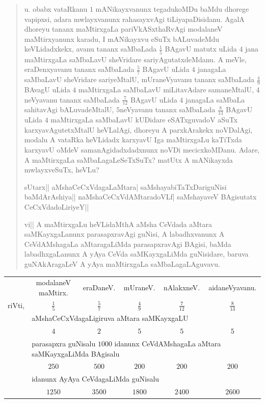 \begin{verse}
u. obabx vataRkanu $1$ mANikayxvanunx tegadukoMDu baMdu dhorege
vapipxsi, adara mwlayxvanunx rahasayxvAgi tiLiyapaDisidanu. AgalA
dhoreyu tananx maMtirxgaLa pariVkASxthaRvAgi modalaneV maMtirxyanunx
karadu, I mANikayxvu eSuTx bALuvadeMdu keVLidadxkekx, avanu tananx
saMbaLada $\frac{1}{5}$ BAgavU matutx uLida $4$ jana maMtirxgaLa
saMbaLavU sheVridare sariyAgutatxdeMdanu. A meVle, eraDenxyavanu
tananx saMbaLada $\frac{5}{7}$ BAgavU uLida $4$ janagaLa saMbaLavU
sheVridare sariyeMtalU, mUraneVyavanu tananx saMbaLada $\frac{4}{9}$
BAvagU uLida $4$ maMtirxgaLa saMbaLavU miLitavAdare samaneMtalU,
$4$neVyavanu tananx saMbaLada $\frac{7}{12}$ BAgavU uLida $4$ janagaLa
saMbaLa sahitavAgi bALuvadeMtalU, $5$neVyavanu tananx saMbaLada
$\frac{8}{13}$ BAgavU uLida $4$ maMtirxgaLa saMbaLavU kUDidare
eSATxguvadoV aSuTx karxyavAgutetxMtalU heVLalAgi, dhoreyu A
parxkArakekx noVDalAgi, modalu A vataRka heVLidadx karxyavU Iga
maMtirxgaLu kaTiTxda karxyavU oMdeV samanAgidadxdadxnunx noVDi
mecicxkoMDanu. Adare, A maMtirxgaLa saMbaLagaLeSeTxSuTx? matUtx A
mANikayxda mwlayxveSuTx, heVLu? 

sUtarx|| aMshaCeCxVdagaLaMtara| saMshayabiTaTxDariguNisi
baMdArAshiya|| naMshaCeCxVdAMtaradoVLf| saMshayaveV BAgisutatx
CeCxVdadoLiriyeY|| 

vi|| A maMtirxgaLu heVLidaMthA aMsha CeVdada aMtara saMKayxgaLanunx
parasapxravAgi guNisi, A labadhx\-vanunx A CeVdAMshagaLa aMtaragaLiMda
parasapxravAgi BAgisi, baMda labadhxgaLanunx A yAya CeVda
saMKayxgaLiMda guNisidare, baruva guNAkAragaLeV A yAya maMtirxgaLa
saMbaLagaLAguvavu. 
\end{verse}

\begin{center}
\begin{tabular}{lccccc}
 & modalaneV maMtirx. & eraDaneV. & mUraneV. & nAlakxneV. &
 aidaneVyavanu.\\[2pt]
riVti, & $\frac{1}{5}$ & $\frac{5}{7}$ & $\frac{4}{9}$ &
 $\frac{7}{12}$ & $\frac{8}{13}$\\[4pt]
 & \multicolumn{5}{l}{aMshaCeCxVdagaLigiruva aMtara
 saMKayxgaLU}\\[2pt]
& $4$ & $2$ & $5$ & $5$ & $5$\\[4pt]
 & \multicolumn{5}{l}{parasapxra guNisalu $1000$ idanunx CeVdAMshagaLa
 aMtara saMKayxgaLiMda BAgisalu}\\[2pt]
& $250$ & $500$ & $200$ & $200$ & $200$\\[5pt]
 & \multicolumn{5}{l}{idanunx AyAya CeVdagaLiMda guNisalu}\\[2pt]
 & $1250$ & $3500$ & $1800$ & $2400$ & $2600$
\end{tabular}
\end{center}


